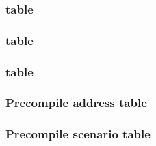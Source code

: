 \subsubsection{         table}    \label{hub: scenarios: tables: call}                
\subsubsection{       table}    \label{hub: scenarios: tables: create}              
\subsubsection{       table}    \label{hub: scenarios: tables: return}              
\subsubsection{Precompile address  table}    \label{hub: scenarios: tables: precompile address}  
\subsubsection{Precompile scenario table}    \label{hub: scenarios: tables: precompile scenario} 
